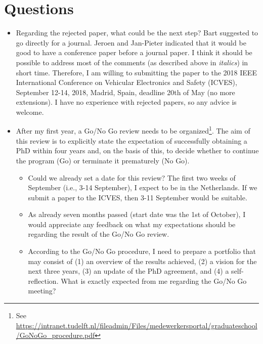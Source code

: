\documentclass[10pt,final,a4paper,oneside,onecolumn]{article}
\begin{document}
\section{Questions}

\begin{itemize}
	\item Regarding the rejected paper, what could be the next step? Bart suggested to go directly for a journal. Jeroen and Jan-Pieter indicated that it would be good to have a conference paper before a journal paper. I think it should be possible to address most of the comments (as described above in \textit{italics}) in short time. Therefore, I am willing to submitting the paper to the 2018 IEEE International Conference on Vehicular Electronics and Safety (ICVES), September 12-14, 2018, Madrid, Spain, deadline 20th of May (no more extensions). I have no experience with rejected papers, so any advice is welcome.
	\item After my first year, a Go/No Go review needs to be organized\footnote{See \url{https://intranet.tudelft.nl/fileadmin/Files/medewerkersportal/graduateschool/GoNoGo_procedure.pdf}}. The aim of this review is to explicitly state the expectation of successfully obtaining a PhD within four years and, on the basis of this, to decide whether to continue the program (Go) or terminate it prematurely (No Go).
	\begin{itemize}
		\item Could we already set a date for this review? The first two weeks of September (i.e., 3-14 September), I expect to be in the Netherlands. If we submit a paper to the ICVES, then 3-11 September would be suitable.
		\item As already seven months passed (start date was the 1st of October), I would appreciate any feedback on what my expectations should be regarding the result of the Go/No Go review.
		\item According to the Go/No Go procedure, I need to prepare a portfolio that may consist of (1) an overview of the results achieved, (2) a vision for the next three years, (3) an update of the PhD agreement, and (4) a self-reflection. What is exactly expected from me regarding the Go/No Go meeting?
	\end{itemize}
\end{itemize}


\printbibliography
\end{document}
